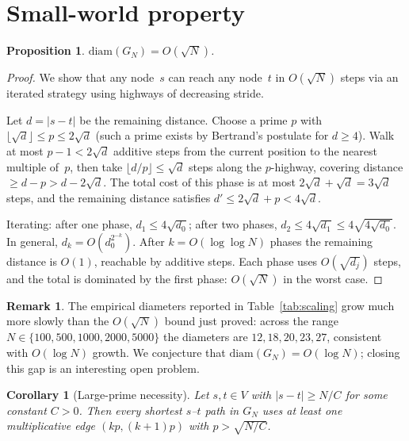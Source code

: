 \documentclass[11pt]{article}
\theoremstyle{plain}
\newtheorem{proposition}[theorem]{Proposition}
\newtheorem{corollary}[theorem]{Corollary}
\theoremstyle{definition}
\newtheorem{remark}[theorem]{Remark}
\begin{document}
\section{Small-world property}

\begin{proposition}\label{prop:diameter}
$\mathrm{diam}(G_N) = O(\sqrt{N})$.
\end{proposition}

\begin{proof}
We show that any node~$s$ can reach any node~$t$ in $O(\sqrt{N})$ steps
via an iterated strategy using highways of decreasing stride.

Let $d = |s - t|$ be the remaining distance. Choose a prime $p$ with
$\lfloor \sqrt{d} \rfloor \le p \le 2\sqrt{d}$ (such a prime exists by
Bertrand's postulate for $d \ge 4$). Walk at most $p - 1 < 2\sqrt{d}$
additive steps from the current position to the nearest multiple of~$p$,
then take $\lfloor d/p \rfloor \le \sqrt{d}$ steps along the $p$-highway,
covering distance $\ge d - p > d - 2\sqrt{d}$.
The total cost of this phase is at most $2\sqrt{d} + \sqrt{d} = 3\sqrt{d}$
steps, and the remaining distance satisfies $d' \le 2\sqrt{d} + p < 4\sqrt{d}$.

Iterating: after one phase, $d_1 \le 4\sqrt{d_0}$; after two phases,
$d_2 \le 4\sqrt{d_1} \le 4\sqrt{4\sqrt{d_0}}$. In general,
$d_k = O(d_0^{2^{-k}})$. After $k = O(\log \log N)$ phases the remaining
distance is $O(1)$, reachable by additive steps. Each phase uses
$O(\sqrt{d_j})$ steps, and the total is dominated by the first phase:
$O(\sqrt{N})$ in the worst case.
\end{proof}

\begin{remark}
The empirical diameters reported in Table~\ref{tab:scaling} grow much more slowly
than the $O(\sqrt{N})$ bound just proved: across the range $N \in \{100, 500, 1000, 2000, 5000\}$
the diameters are $12, 18, 20, 23, 27$, consistent with $O(\log N)$ growth.
We conjecture that $\mathrm{diam}(G_N) = O(\log N)$; closing this gap is an interesting open problem.
\end{remark}

\begin{corollary}[Large-prime necessity]\label{cor:largeprime}
Let $s, t \in V$ with $|s - t| \ge N / C$ for some constant $C > 0$.
Then every shortest $s$--$t$ path in $G_N$ uses at least one multiplicative
edge $(kp, (k+1)p)$ with $p > \sqrt{N/C}$.
\end{corollary}
\end{document}

